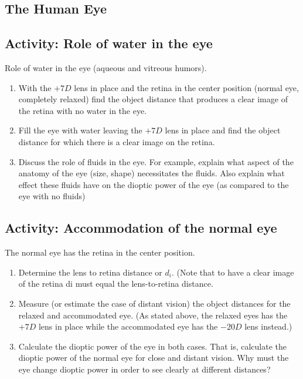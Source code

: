 \begin{multicols}{2}
\section{The Human Eye}

\subsection{Activity: Role of water in the eye}
Role of water in the eye (aqueous and vitreous humors).
\begin{enumerate}
	\item With the $+7D$ lens in place and the retina in the center position (normal eye, completely relaxed) find the object distance that produces a clear image of the retina with no water in the eye.
	\item Fill the eye with water leaving the $+7D$ lens in place and find the object distance for which there is a clear image on the retina.
	\item Discuss the role of fluids in the eye. For example, explain what aspect of the anatomy of the eye (size, shape) necessitates the fluids. Also explain what effect these fluids have on the dioptic power of the eye (as compared to the eye with no fluids)
\end{enumerate}

\subsection{Activity: Accommodation of the normal eye}
The normal eye has the retina in the center position.
\begin{enumerate}
	\item Determine the lens to retina distance or $d_i$. (Note that to have a clear image of the retina di must equal the lens-to-retina distance.
	\item Measure (or estimate the case of distant vision) the object distances for the relaxed and accommodated eye. (As stated above, the relaxed eyes has the $+7 D$ lens in place while the accommodated eye has the $-20 D$ lens instead.)
	\item Calculate the dioptic power of the eye in both cases. That is, calculate the dioptic power of the normal eye for close and distant vision.
Why must the eye change dioptic power in order to see clearly at different distances?
\end{enumerate}


\end{multicols}
